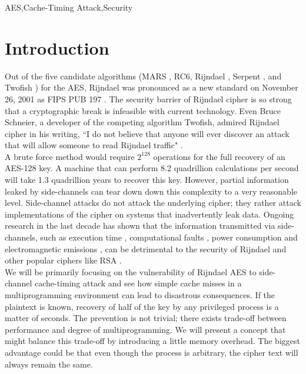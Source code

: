 \documentclass[3p]{elsarticle}
\begin{document}
\begin{frontmatter}
\begin{keyword}
AES\sep Cache-Timing Attack\sep Security
\end{keyword}

\end{frontmatter}

\linenumbers

\section{Introduction}

Out of the five candidate algorithms (MARS \cite{mars1998proposal}, RC6, Rijndael \cite{rijndael1998proposal}, Serpent \cite{serpent1998proposal}, and Twofish \cite{twofish1998proposal}) for the AES, Rijndael was pronounced as a new standard on November 26, 2001 as FIPS PUB 197 \cite{fips}. The security barrier of Rijndael cipher is so strong that a cryptographic break is infeasible with current technology. Even Bruce Schneier, a developer of the competing algorithm Twofish, admired Rijndael cipher in his writing, ``I do not believe that anyone will ever discover an attack that will allow someone to read Rijndael traffic" \cite{admire}.\\

A brute force method would require $2^{128}$ operations for the full recovery of an AES-128 key. A machine that can perform 8.2 quadrillion calculations per second will take 1.3 quadrillion years to recover this key. However, partial information leaked by side-channels can tear down down this complexity to a very reasonable level. Side-channel attacks do not attack the underlying cipher; they rather attack implementations of the cipher on systems that inadvertently leak data. Ongoing research in the last decade has shown that the information transmitted via side-channels, such as execution time \cite{spadavecchia2006network}, computational faults \cite{boneh}, power consumption \cite{kocher} and electromagnetic emissions \cite{em, em2, scards}, can be detrimental to the security of Rijndael \cite{daemen2002design} and other popular ciphers like RSA \cite{mit}.\\

We will be primarily focusing on the vulnerability of Rijndael AES to side-channel cache-timing attack and see how simple cache misses in a multiprogramming environment can lead to disastrous consequences. If the plaintext is known, recovery of half of the key by any privileged process is a matter of seconds. The prevention is not trivial; there exists trade-off between performance and degree of multiprogramming. We will present a concept that might balance this trade-off by introducing a little memory overhead. The biggest advantage could be that even though the process is arbitrary, the cipher text will always remain the same.\\
\end{document}
